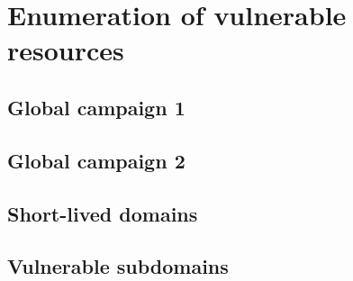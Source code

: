\section{Enumeration of vulnerable resources}
\subsection{Global campaign 1}
\subsection{Global campaign 2}
\subsection{Short-lived domains}
\subsection{Vulnerable subdomains}
